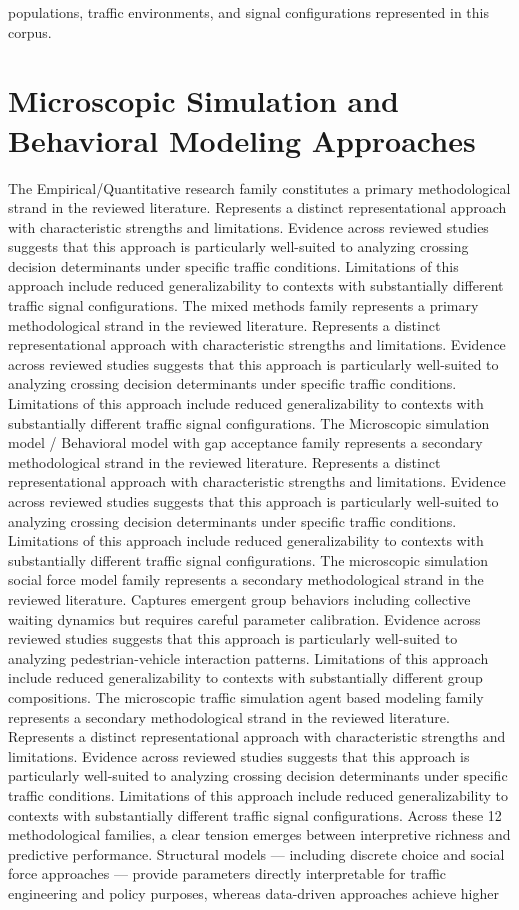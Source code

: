 \documentclass{article}
\begin{document}
populations, traffic environments, and signal configurations represented in this corpus.

\section{Microscopic Simulation and Behavioral Modeling Approaches}
The Empirical/Quantitative research family constitutes a primary methodological strand in the reviewed literature. Represents a distinct representational approach with characteristic strengths and limitations. Evidence across reviewed studies suggests that this approach is particularly well-suited to analyzing crossing decision determinants under specific traffic conditions. Limitations of this approach include reduced generalizability to contexts with substantially different traffic signal configurations. The mixed methods family represents a primary methodological strand in the reviewed literature. Represents a distinct representational approach with characteristic strengths and limitations. Evidence across reviewed studies suggests that this approach is particularly well-suited to analyzing crossing decision determinants under specific traffic conditions. Limitations of this approach include reduced generalizability to contexts with substantially different traffic signal configurations. The Microscopic simulation model / Behavioral model with gap acceptance family represents a secondary methodological strand in the reviewed literature. Represents a distinct representational approach with characteristic strengths and limitations. Evidence across reviewed studies suggests that this approach is particularly well-suited to analyzing crossing decision determinants under specific traffic conditions. Limitations of this approach include reduced generalizability to contexts with substantially different traffic signal configurations. The microscopic simulation social force model family represents a secondary methodological strand in the reviewed literature. Captures emergent group behaviors including collective waiting dynamics but requires careful parameter calibration. Evidence across reviewed studies suggests that this approach is particularly well-suited to analyzing pedestrian-vehicle interaction patterns. Limitations of this approach include reduced generalizability to contexts with substantially different group compositions. The microscopic traffic simulation agent based modeling family represents a secondary methodological strand in the reviewed literature. Represents a distinct representational approach with characteristic strengths and limitations. Evidence across reviewed studies suggests that this approach is particularly well-suited to analyzing crossing decision determinants under specific traffic conditions. Limitations of this approach include reduced generalizability to contexts with substantially different traffic signal configurations. Across these 12 methodological families, a clear tension emerges between interpretive richness and predictive performance. Structural models — including discrete choice and social force approaches — provide parameters directly interpretable for traffic engineering and policy purposes, whereas data-driven approaches achieve higher 
\end{document}
